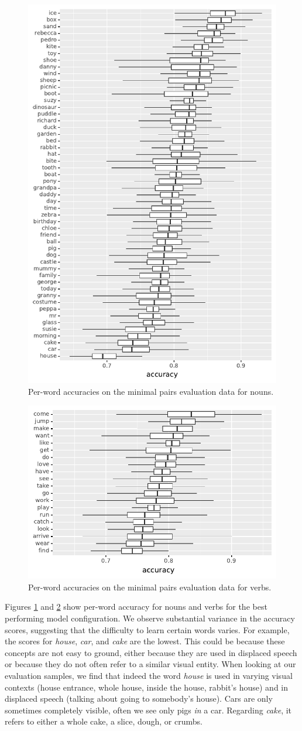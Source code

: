 \begin{figure}[htb]
  \centering
  \includegraphics[width=.5\textwidth]{results/targeted_triplets/acc_per_word_NOUN.pdf}
  \caption{Per-word accuracies on the minimal pairs evaluation data for nouns.}
  \label{fig:accuracy_targeted_triplets_nouns}
\end{figure}

\begin{figure}[htb]
	\centering
	\includegraphics[width=.5\textwidth]{results/targeted_triplets/acc_per_word_VERB.pdf}
	\caption{Per-word accuracies on the minimal pairs evaluation data for 
	verbs.}
	\label{fig:accuracy_targeted_triplets_verbs}
\end{figure}

Figures \ref{fig:accuracy_targeted_triplets_nouns} and 
\ref{fig:accuracy_targeted_triplets_verbs} show per-word
accuracy for nouns and verbs for the best performing model configuration.
We observe substantial variance in the accuracy scores, suggesting that the 
difficulty to learn certain words varies. For example, the 
scores for \textit{house}, \textit{car}, and \textit{cake} are the lowest. This could be 
because these concepts are not easy to ground, either because they are used in 
displaced speech or because they do not often refer to a similar visual entity. 
When looking at our evaluation samples, we find that indeed the word \textit{house} 
is used in varying visual contexts (house entrance, whole house, inside the
house, rabbit's house) and in displaced speech (talking about going 
to somebody's house). Cars are only sometimes completely visible, often we see 
only pigs \textit{in} a car. Regarding \textit{cake}, it refers to either a 
whole cake, a slice, dough, or crumbs.

